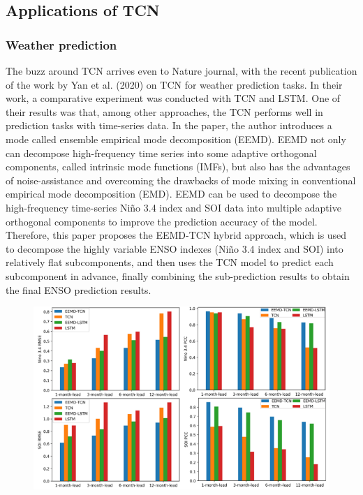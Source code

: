 \subsection{Applications of TCN}

\subsubsection{Weather prediction}
The buzz around TCN arrives even to Nature journal, with the recent publication of the work by Yan et al. (2020) on TCN for weather prediction tasks. In their work, a comparative experiment was conducted with TCN and LSTM. One of their results was that, among other approaches, the TCN performs well in prediction tasks with time-series data.
In the paper, the author introduces a mode called ensemble empirical mode decomposition (EEMD). EEMD not only can decompose high-frequency time series into some adaptive orthogonal components, called intrinsic mode functions (IMFs), but also has the advantages of noise-assistance and overcoming the drawbacks of mode mixing in conventional empirical mode decomposition (EMD). EEMD can be used to decompose the high-frequency time-series Niño 3.4 index and SOI data into multiple adaptive orthogonal components to improve the prediction accuracy of the model. Therefore, this paper proposes the EEMD-TCN hybrid approach, which is used to decompose the highly variable ENSO indexes (Niño 3.4 index and SOI) into relatively flat subcomponents, and then uses the TCN model to predict each subcomponent in advance, finally combining the sub-prediction results to obtain the final ENSO prediction results.
\begin{figure}[h]
    \includegraphics[width=\textwidth]{../Figures/ch3_6_weather.png}
\end{figure}

